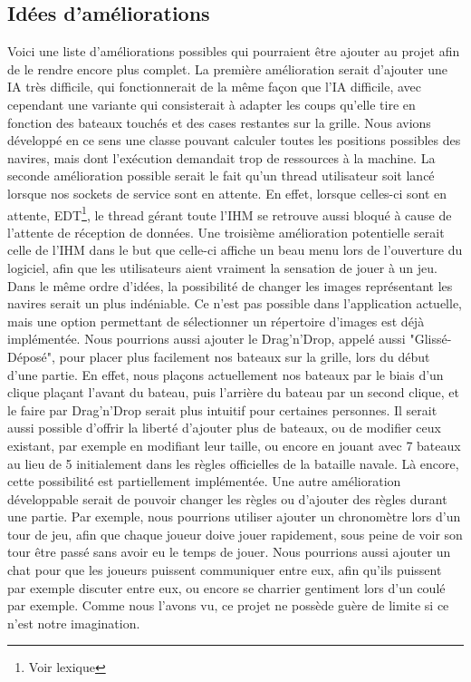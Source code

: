\subsection{Idées d'améliorations}
	Voici une liste d'améliorations possibles qui pourraient être ajouter au projet afin de le rendre encore plus complet.\newline
	La première amélioration serait d'ajouter une IA très difficile, qui fonctionnerait de la même façon que l'IA difficile, avec cependant une variante qui consisterait à adapter les coups qu'elle tire en fonction des bateaux touchés et des cases restantes sur la grille. Nous avions développé en ce sens une classe pouvant calculer toutes les positions possibles des navires, mais dont l'exécution demandait trop de ressources à la machine.\newline
	La seconde amélioration possible serait le fait qu'un thread utilisateur soit lancé lorsque nos sockets de service sont en attente. En effet, lorsque celles-ci sont en attente, EDT\footnote{Voir lexique}, le thread gérant toute l'IHM se retrouve aussi bloqué à cause de l'attente de réception de données.\newline
	Une troisième amélioration potentielle serait celle de l'IHM dans le but que celle-ci affiche un beau menu lors de l'ouverture du logiciel, afin que les utilisateurs aient vraiment la sensation de jouer à un jeu.\newline
	Dans le même ordre d'idées, la possibilité de changer les images représentant les navires serait un plus indéniable. Ce n'est pas possible dans l'application actuelle, mais une option permettant de sélectionner un répertoire d'images est déjà implémentée.\newline
	Nous pourrions aussi ajouter le Drag'n'Drop, appelé aussi "Glissé-Déposé", pour placer plus facilement nos bateaux sur la grille, lors du début d'une partie. En effet, nous plaçons actuellement nos bateaux par le biais d'un clique plaçant l'avant du bateau, puis l'arrière du bateau par un second clique, et le faire par Drag'n'Drop serait plus intuitif pour certaines personnes.\newline
	Il serait aussi possible d'offrir la liberté d'ajouter plus de bateaux, ou de modifier ceux existant, par exemple en modifiant leur taille, ou encore en jouant avec 7 bateaux au lieu de 5 initialement dans les règles officielles de la bataille navale. Là encore, cette possibilité est partiellement implémentée.\newline
	Une autre amélioration développable serait de pouvoir changer les règles ou d'ajouter des règles durant une partie. Par exemple, nous pourrions utiliser ajouter un chronomètre lors d'un tour de jeu, afin que chaque joueur doive jouer rapidement, sous peine de voir son tour être passé sans avoir eu le temps de jouer.
	Nous pourrions aussi ajouter un chat pour que les joueurs puissent communiquer entre eux, afin qu'ils puissent par exemple discuter entre eux, ou encore se charrier gentiment lors d'un coulé par exemple.\newline
	Comme nous l'avons vu, ce projet ne possède guère de limite si ce n'est notre imagination.\newline

